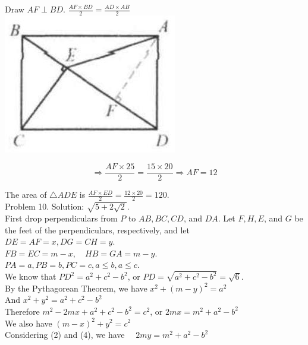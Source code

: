 \documentclass[10pt]{article}
\begin{document}
Draw \(A F \perp B D\). \(\frac{A F \times B D}{2}=\frac{A D \times A B}{2}\)\\
\includegraphics[max width=\textwidth, center]{2025_04_17_97bc1f7e44d93c271a88g-095}

\[
\Rightarrow \frac{A F \times 25}{2}=\frac{15 \times 20}{2} \Rightarrow A F=12
\]

The area of \(\triangle A D E\) is \(\frac{A F \times E D}{2}=\frac{12 \times 20}{2}=120\).\\
Problem 10. Solution: \(\sqrt{5+2 \sqrt{2}}\).\\
First drop perpendiculars from \(P\) to \(A B, B C, C D\), and \(D A\). Let \(F, H, E\), and \(G\) be the feet of the perpendiculars, respectively, and let\\
\(D E=A F=x, D G=C H=y\).\\
\(F B=E C=m-x, \quad H B=G A=m-y\).\\
\(P A=a, P B=b, P C=c, a \leq b, a \leq c\).\\
We know that \(P D^{2}=a^{2}+c^{2}-b^{2}\), or \(P D=\sqrt{a^{2}+c^{2}-b^{2}}=\sqrt{6}\).\\
By the Pythagorean Theorem, we have \(x^{2}+(m-y)^{2}=a^{2}\)\\
And \(x^{2}+y^{2}=a^{2}+c^{2}-b^{2}\)\\
Therefore \(m^{2}-2 m x+a^{2}+c^{2}-b^{2}=c^{2}\), or \(2 m x=m^{2}+a^{2}-b^{2}\)\\
We also have \((m-x)^{2}+y^{2}=c^{2}\)\\
Considering (2) and (4), we have \(\quad 2 m y=m^{2}+a^{2}-b^{2}\)
\end{document}
